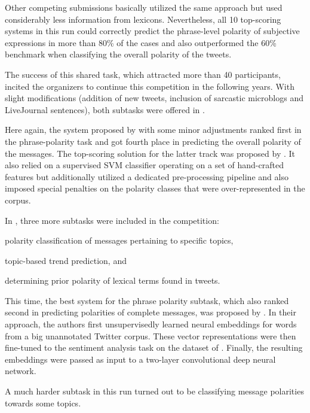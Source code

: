 Other competing submissions \cite{Becker:13,Guenther:13,Kokciyan:13}
basically utilized the same approach but used considerably less
information from lexicons.  Nevertheless, all 10 top-scoring systems
in this run could correctly predict the phrase-level polarity of
subjective expressions in more than 80\% of the cases and also
outperformed the 60\% benchmark when classifying the overall polarity
of the tweets.

The success of this shared task, which attracted more than 40
participants, incited the organizers to continue this competition in
the following years.  With slight modifications (addition of new
tweets, inclusion of sarcastic microblogs and LiveJournal sentences),
both subtasks were offered in \citeyear{Rosenthal:14}
\cite[cf.][]{Rosenthal:14}.

Here again, the system proposed by \citet{Mohammad:13} with some minor
adjustments \cite{Zhu:14} ranked first in the phrase-polarity task and
got fourth place in predicting the overall polarity of the messages.
The top-scoring solution for the latter track was proposed by
\citet{Miura:14}.  It also relied on a supervised SVM classifier
operating on a set of hand-crafted features but additionally utilized
a dedicated pre-processing pipeline and also imposed special penalties
on the polarity classes that were over-represented in the corpus.

In \citeyear{Rosenthal:15}, three more subtasks were included in the
competition:
\begin{inparaenum}
  \item polarity classification of messages pertaining to specific
    topics,
  \item topic-based trend prediction, and
  \item determining prior polarity of lexical terms found in tweets.
\end{inparaenum}

This time, the best system for the phrase polarity subtask, which also
ranked second in predicting polarities of complete messages, was
proposed by \citet{Severyn:15}.  In their approach, the authors first
unsupervisedly learned neural embeddings for words from a big
unannotated Twitter corpus.  These vector representations were then
fine-tuned to the sentiment analysis task on the dataset of
\citet{Go:09}.  Finally, the resulting embeddings were passed as input
to a two-layer convolutional deep neural network.

A much harder subtask in this run turned out to be classifying message
polarities towards some topics.

